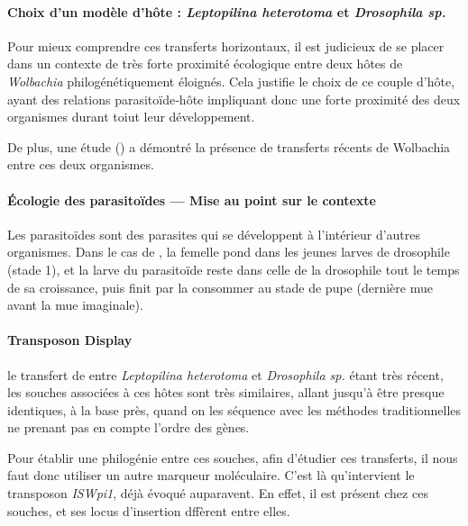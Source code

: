 \paragraph{Choix d’un modèle d’hôte : \textit{Leptopilina heterotoma} et \textit{Drosophila sp.}\\}
Pour mieux comprendre ces transferts horizontaux, il est judicieux de se placer dans un contexte de très forte proximité écologique entre deux hôtes de \textit{Wolbachia} philogénétiquement éloignés. Cela justifie le choix de ce couple d’hôte, ayant des relations parasitoïde‐hôte impliquant donc une forte proximité des deux organismes durant toiut leur développement.

De plus, une étude (\cite{vavre1999}) a démontré la présence de transferts récents de Wolbachia entre ces deux organismes.

\begin{encart}
\paragraph{Écologie des parasitoïdes — Mise au point sur le contexte} %
\label{par:parasitoïdes}
Les parasitoïdes sont des parasites qui se développent à l’intérieur d’autres organismes. Dans le cas de , la femelle pond dans les jeunes larves de drosophile (stade 1), et la larve du parasitoïde reste dans celle de la drosophile tout le temps de sa croissance, puis finit par la consommer au stade de pupe (dernière mue avant la mue imaginale).
\end{encart}

\paragraph{Transposon Display\\} %
\label{par:transposon_display}
le transfert de  entre \textit{Leptopilina heterotoma} et \textit{Drosophila sp.} étant très récent, les souches associées à ces hôtes sont très similaires, allant jusqu’à être presque identiques, à la base près, quand on les séquence avec les méthodes traditionnelles ne prenant pas en compte l’ordre des gènes.

Pour établir une philogénie entre ces souches, afin d’étudier ces transferts, il nous faut donc utiliser un autre marqueur moléculaire. C’est là qu’intervient le transposon \textit{ISWpi1}, déjà évoqué auparavent. En effet, il est présent chez ces souches, et ses locus d’insertion dffèrent entre elles.

